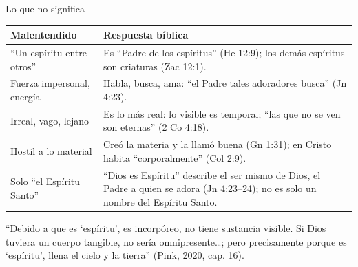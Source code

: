 \documentclass[hyperref={bookmarks=false},aspectratio=169]{beamer}
\begin{document}
\begin{frame}{Lo que no significa}
\scriptsize\renewcommand{\arraystretch}{1.2}
\begin{tabular}{@{}>{\RaggedRight\arraybackslash}p{3.5cm}>{\RaggedRight\arraybackslash}p{8.3cm}@{}}
\toprule
\textbf{Malentendido} & \textbf{Respuesta bíblica} \\ \midrule
``Un espíritu entre otros'' & Es ``Padre de los espíritus'' (He 12:9); los demás espíritus son criaturas (Zac 12:1). \\
Fuerza impersonal, energía & Habla, busca, ama: ``el Padre tales adoradores busca'' (Jn 4:23). \\
Irreal, vago, lejano & Es lo más real: lo visible es temporal; ``las que no se ven son eternas'' (2 Co 4:18). \\
Hostil a lo material & Creó la materia y la llamó buena (Gn 1:31); en Cristo habita ``corporalmente'' (Col 2:9). \\
Solo ``el Espíritu Santo'' & ``Dios es Espíritu'' describe el ser mismo de Dios, el Padre a quien se adora (Jn 4:23--24); no es solo un nombre del Espíritu Santo. \\
\bottomrule
\end{tabular}\par\medskip
\begin{tcolorbox}[colback=papiro,colframe=dorado,boxrule=1.2pt,arc=3pt]
\small ``Debido a que es `espíritu', es incorpóreo, no tiene sustancia visible. Si Dios tuviera un cuerpo tangible, no sería omnipresente\ldots; pero precisamente porque es `espíritu', llena el cielo y la tierra'' (Pink, 2020, cap. 16).
\end{tcolorbox}
\end{frame}
\end{document}
